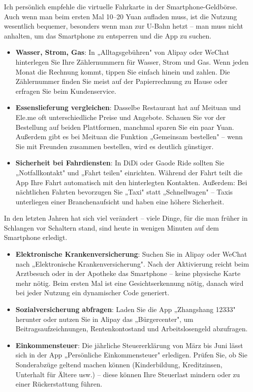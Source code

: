 Ich persönlich empfehle die virtuelle Fahrkarte in der Smartphone-Geldbörse. Auch wenn man beim ersten Mal 10–20 Yuan aufladen muss, ist die Nutzung wesentlich bequemer, besonders wenn man zur U-Bahn hetzt – man muss nicht anhalten, um das Smartphone zu entsperren und die App zu suchen.


\begin{itemize}
  \item \textbf{Wasser, Strom, Gas}: In „Alltagsgebühren" von Alipay oder WeChat hinterlegen Sie Ihre Zählernummern für Wasser, Strom und Gas. Wenn jeden Monat die Rechnung kommt, tippen Sie einfach hinein und zahlen. Die Zählernummer finden Sie meist auf der Papierrechnung zu Hause oder erfragen Sie beim Kundenservice.
  \item \textbf{Essenslieferung vergleichen}: Dasselbe Restaurant hat auf Meituan und Ele.me oft unterschiedliche Preise und Angebote. Schauen Sie vor der Bestellung auf beiden Plattformen, manchmal sparen Sie ein paar Yuan. Außerdem gibt es bei Meituan die Funktion „Gemeinsam bestellen" – wenn Sie mit Freunden zusammen bestellen, wird es deutlich günstiger.
  \item \textbf{Sicherheit bei Fahrdiensten}: In DiDi oder Gaode Ride sollten Sie „Notfallkontakt" und „Fahrt teilen" einrichten. Während der Fahrt teilt die App Ihre Fahrt automatisch mit den hinterlegten Kontakten. Außerdem: Bei nächtlichen Fahrten bevorzugen Sie „Taxi" statt „Schnellwagen" – Taxis unterliegen einer Branchenaufsicht und haben eine höhere Sicherheit.
\end{itemize}


In den letzten Jahren hat sich viel verändert – viele Dinge, für die man früher in Schlangen vor Schaltern stand, sind heute in wenigen Minuten auf dem Smartphone erledigt.

\begin{itemize}
  \item \textbf{Elektronische Krankenversicherung}: Suchen Sie in Alipay oder WeChat nach „Elektronische Krankenversicherung". Nach der Aktivierung reicht beim Arztbesuch oder in der Apotheke das Smartphone – keine physische Karte mehr nötig. Beim ersten Mal ist eine Gesichtserkennung nötig, danach wird bei jeder Nutzung ein dynamischer Code generiert.
  \item \textbf{Sozialversicherung abfragen}: Laden Sie die App „Zhangshang 12333" herunter oder nutzen Sie in Alipay das „Bürgercenter", um Beitragsaufzeichnungen, Rentenkontostand und Arbeitslosengeld abzufragen.
  \item \textbf{Einkommensteuer}: Die jährliche Steuererklärung von März bis Juni lässt sich in der App „Persönliche Einkommensteuer" erledigen. Prüfen Sie, ob Sie Sonderabzüge geltend machen können (Kinderbildung, Kreditzinsen, Unterhalt für Ältere usw.) – diese können Ihre Steuerlast mindern oder zu einer Rückerstattung führen.
\end{itemize}

